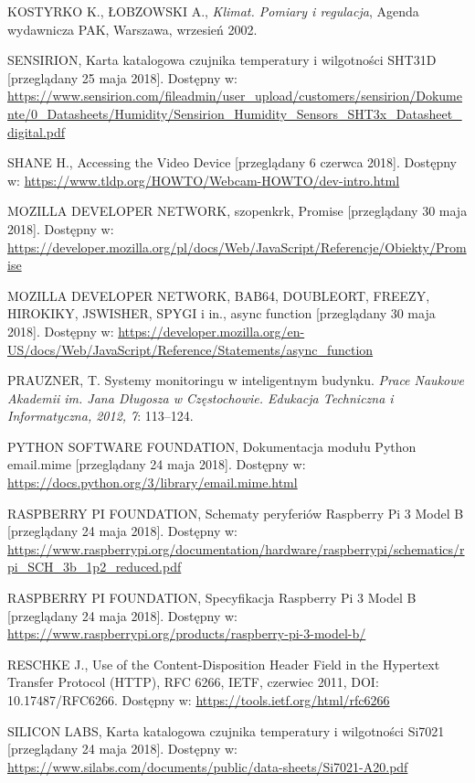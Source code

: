 \documentclass[a4paper,11pt,twoside]{article}
\begin{document}
\begin{thebibliography}{9}
\uppercase{Kostyrko K., Łobzowski A.}, \textit{Klimat. Pomiary i regulacja}, Agenda wydawnicza PAK, Warszawa, wrzesień 2002.

\uppercase{Sensirion}, Karta katalogowa czujnika temperatury i wilgotności SHT31D [przeglądany 25 maja 2018].
Dostępny w: \url{https://www.sensirion.com/fileadmin/user_upload/customers/sensirion/Dokumente/0_Datasheets/Humidity/Sensirion_Humidity_Sensors_SHT3x_Datasheet_digital.pdf}

SHANE H., Accessing the Video Device [przeglądany 6 czerwca 2018].
Dostępny w: \url{https://www.tldp.org/HOWTO/Webcam-HOWTO/dev-intro.html}

\uppercase{Mozilla Developer Network}, szopenkrk, Promise [przeglądany 30 maja 2018].
Dostępny w: \url{https://developer.mozilla.org/pl/docs/Web/JavaScript/Referencje/Obiekty/Promise}

\uppercase{Mozilla Developer Network, Bab64, doubleOrt, freezy, hirokiky, jswisher, spygi} i in., async function [przeglądany 30 maja 2018].
Dostępny w: \url{https://developer.mozilla.org/en-US/docs/Web/JavaScript/Reference/Statements/async_function}

PRAUZNER, T. Systemy monitoringu w inteligentnym budynku. \textit{Prace Naukowe Akademii im. Jana Długosza w Częstochowie. Edukacja Techniczna i Informatyczna, 2012, 7}: 113--124.

\uppercase{Python Software Foundation}, Dokumentacja modułu Python email.mime [przeglądany 24 maja 2018].
Dostępny w: \url{https://docs.python.org/3/library/email.mime.html}

\uppercase{Raspberry Pi Foundation}, Schematy peryferiów Raspberry Pi 3 Model B [przeglądany 24 maja 2018].
Dostępny w: \url{https://www.raspberrypi.org/documentation/hardware/raspberrypi/schematics/rpi_SCH_3b_1p2_reduced.pdf}

\uppercase{Raspberry Pi Foundation}, Specyfikacja Raspberry Pi 3 Model B [przeglądany 24 maja 2018].
Dostępny w: \url{https://www.raspberrypi.org/products/raspberry-pi-3-model-b/}

\uppercase{Reschke J.}, Use of the Content-Disposition Header Field in the Hypertext Transfer Protocol (HTTP), RFC 6266, IETF, czerwiec 2011, DOI: 10.17487/RFC6266.
Dostępny w: \url{https://tools.ietf.org/html/rfc6266}

\uppercase{Silicon Labs}, Karta katalogowa czujnika temperatury i wilgotności Si7021 [przeglądany 24 maja 2018].
Dostępny w: \url{https://www.silabs.com/documents/public/data-sheets/Si7021-A20.pdf}


\end{thebibliography}
\end{document}
